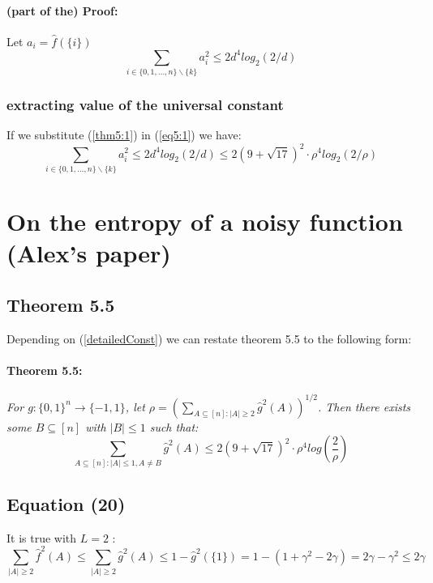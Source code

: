 \documentclass{article}
\begin{document}
				\paragraph{(part of the) Proof:}
					Let $a_i = \hat{f}(\{i\})$
					\begin{equation} \label{eq5:1}
						\sum_{i \in \{0,1, \dots , n\} \backslash \{k\}} a_i^2 \leq 2d^4log_2(2/d)
					\end{equation}		
			\subsubsection{extracting value of the universal constant}
				If we substitute (\ref{thm5:1}) in (\ref{eq5:1}) we have:
				\begin{equation} \label{detailedConst}
					\sum_{i \in \{0,1, \dots , n\} \backslash \{k\}} a_i^2 
					\leq 2d^4log_2(2/d) 
					\leq 2 \left( 9 + \sqrt{17} \right) ^ 2 \cdot \rho^4 log_2(2/\rho)
				\end{equation}
	
	
	\section{On the entropy of a noisy function (Alex's paper)}
		\subsection{Theorem 5.5}
			Depending on (\ref{detailedConst}) we can restate theorem 5.5 to the following form:
			\paragraph{Theorem 5.5:} \textit{For $ g: \{0,1\}^n \rightarrow \{-1,1\}$, let $\rho = \left( \sum_{A \subseteq [n]: |A| \geq 2} \hat{g}^2(A) \right) ^ {1/2} $. Then there exists some $ B \subseteq [n]$ with $|B| \leq 1$ such that:}
				$$  \sum_{A \subseteq [n]: |A| \leq 1, A \neq B} \hat{g}^2 (A) \leq 2 \left( 9 + \sqrt{17} \right)^2 \cdot \rho^4 log \left( \frac{2}{\rho} \right) $$
	
		\subsection{Equation (20)}
			It is true with $L=2$ :
			\begin{equation} \label{eq:20}
				\sum_{|A| \geq 2} \hat{f}^2 (A) 
				\leq \sum_{|A| \geq 2} \hat{g}^2 (A) 
				\leq 1 - \hat{g}^2(\{1\}) = 1 - \left( 1 + \gamma^2 - 2 \gamma \right) = 2 \gamma - \gamma^2 
				\leq 2 \gamma
			\end{equation}
	
\end{document}
